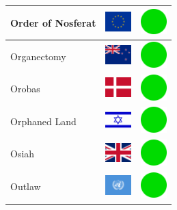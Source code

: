 \documentclass[12pt, a4paper, twoside]{report}
\begin{document}
\begin{center}
\begin{longtable}{|p{5cm}|p{2cm}|p{2cm}|}
 Order of Nosferat                                          & \includegraphics[width=1cm]{../img/flags/eu} &   \includegraphics[width=1cm]{../likes/y} \\ \hline
 Organectomy                                                & \includegraphics[width=1cm]{../img/flags/nz} &   \includegraphics[width=1cm]{../likes/y} \\ \hline
 Orobas                                                     & \includegraphics[width=1cm]{../img/flags/dk} &   \includegraphics[width=1cm]{../likes/y} \\ \hline
 Orphaned Land                                              & \includegraphics[width=1cm]{../img/flags/il} &   \includegraphics[width=1cm]{../likes/y} \\ \hline
 Osiah                                                      & \includegraphics[width=1cm]{../img/flags/gb} &   \includegraphics[width=1cm]{../likes/y} \\ \hline
 Outlaw                                                     & \includegraphics[width=1cm]{../img/flags/un} &   \includegraphics[width=1cm]{../likes/y} \\ \hline

\end{longtable}
\end{center}
\end{document}
